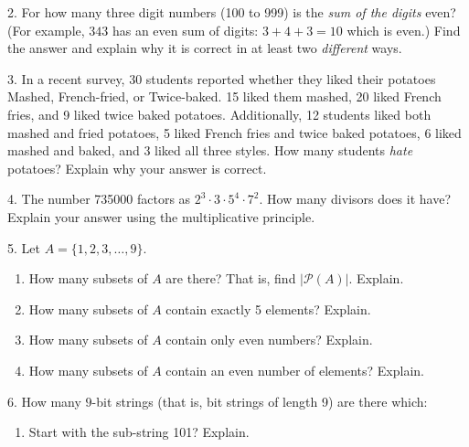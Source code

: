 \documentclass[10pt,]{book}
\theoremstyle{plain}
\theoremstyle{definition}
\theoremstyle{definition}
\theoremstyle{definition}
\numberwithin{equation}{section}
\def\pow{\mathcal P}
\begin{document}
\begin{exerciselist}
\begin{enumerate}[label=(\alph*)]
                
\end{enumerate}
\par\smallskip
\item[2.]\hypertarget{exercise-125}{}
            For how many three digit numbers (100 to 999) is the \emph{sum of the digits} even? (For example, \(343\) has an even sum of digits: \(3+4+3 = 10\) which is even.) Find the answer and explain why it is correct in at least two \emph{different} ways.
\par\smallskip
\item[3.]\hypertarget{exercise-126}{}
            In a recent survey, 30 students reported whether they liked their potatoes Mashed, French-fried, or Twice-baked. 15 liked them mashed, 20 liked French fries, and 9 liked twice baked potatoes. Additionally, 12 students liked both mashed and fried potatoes, 5 liked French fries and twice baked potatoes, 6 liked mashed and baked, and 3 liked all three styles. How many students
            \emph{hate} potatoes? Explain why your answer is correct.
\par\smallskip
\item[4.]\hypertarget{exercise-127}{}
          The number 735000 factors as \(2^3 \cdot 3 \cdot 5^4 \cdot 7^2\). How many divisors does it have? Explain your answer using the multiplicative principle.
\par\smallskip
\item[5.]\hypertarget{exercise-128}{}
            Let \(A = \{1,2,3,\ldots,9\}\).
\leavevmode%
\begin{enumerate}[label=(\alph*)]
\item\hypertarget{li-780}{}
                How many subsets of \(A\) are there? That is, find \(|\pow(A)|\). Explain.

                
\item\hypertarget{li-781}{}
                How many subsets of \(A\) contain exactly 5 elements? Explain.

                
\item\hypertarget{li-782}{}
                How many subsets of \(A\) contain only even numbers? Explain.

                
\item\hypertarget{li-783}{}
                How many subsets of \(A\) contain an even number of elements? Explain.

                
\end{enumerate}
\par\smallskip
\item[6.]\hypertarget{exercise-129}{}
            How many \(9\)-bit strings (that is, bit strings of length 9) are there which:
\leavevmode%
\begin{enumerate}[label=(\alph*)]
\item\hypertarget{li-784}{}
                Start with the sub-string 101? Explain.


\end{enumerate}
\end{exerciselist}
\end{document}
